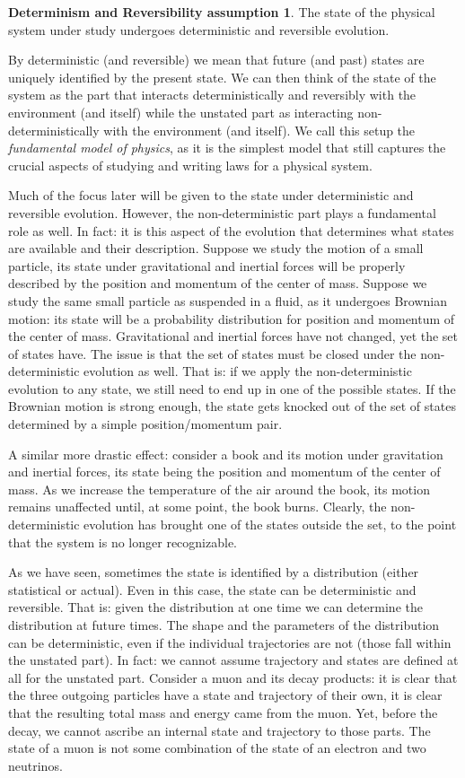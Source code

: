 \documentclass[aps,pra,10pt,twocolumn,floatfix,nofootinbib]{revtex4-1}
\theoremstyle{definition}
\newtheorem*{assump2}{Determinism and Reversibility assumption}
\begin{document}
\begin{assump2}
The state of the physical system under study undergoes deterministic and reversible evolution.
\end{assump2}

By deterministic (and reversible) we mean that future (and past) states are uniquely identified by the present state. We can then think of the state of the system as the part that interacts deterministically and reversibly with the environment (and itself) while the unstated part as interacting non-deterministically with the environment (and itself). We call this setup the \emph{fundamental model of physics}, as it is the simplest model that still captures the crucial aspects of studying and writing laws for a physical system.

Much of the focus later will be given to the state under deterministic and reversible evolution. However, the non-deterministic part plays a fundamental role as well. In fact: it is this aspect of the evolution that determines what states are available and their description. Suppose we study the motion of a small particle, its state under gravitational and inertial forces will be properly described by the position and momentum of the center of mass. Suppose we study the same small particle as suspended in a fluid, as it undergoes Brownian motion: its state will be a probability distribution for position and momentum of the center of mass. Gravitational and inertial forces have not changed, yet the set of states have. The issue is that the set of states must be closed under the non-deterministic evolution as well. That is: if we apply the non-deterministic evolution to any state, we still need to end up in one of the possible states. If the Brownian motion is strong enough, the state gets knocked out of the set of states determined by a simple position/momentum pair.

A similar more drastic effect: consider a book and its motion under gravitation and inertial forces, its state being the position and momentum of the center of mass. As we increase the temperature of the air around the book, its motion remains unaffected until, at some point, the book burns. Clearly, the non-deterministic evolution has brought one of the states outside the set, to the point that the system is no longer recognizable.

As we have seen, sometimes the state is identified by a distribution (either statistical or actual). Even in this case, the state can be deterministic and reversible. That is: given the distribution at one time we can determine the distribution at future times. The shape and the parameters of the distribution can be deterministic, even if the individual trajectories are not (those fall within the unstated part). In fact: we cannot assume trajectory and states are defined at all for the unstated part. Consider a muon and its decay products: it is clear that the three outgoing particles have a state and trajectory of their own, it is clear that the resulting total mass and energy came from the muon. Yet, before the decay, we cannot ascribe an internal state and trajectory to those parts. The state of a muon is not some combination of the state of an electron and two neutrinos.
\end{document}
